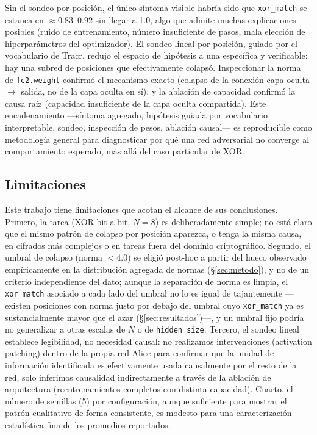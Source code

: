 \documentclass[manuscript,screen]{acmart}
\begin{document}
Sin el sondeo por posición, el único síntoma visible habría sido que \texttt{xor\_match} se
estanca en $\approx 0.83$--$0.92$ sin llegar a 1.0, algo que admite muchas explicaciones
posibles (ruido de entrenamiento, número insuficiente de pasos, mala elección de
hiperparámetros del optimizador). El sondeo lineal por posición, guiado por el vocabulario de
Tracr, redujo el espacio de hipótesis a una específica y verificable: hay una subred de
posiciones que efectivamente colapsó. Inspeccionar la norma de \texttt{fc2.weight} confirmó el
mecanismo exacto (colapso de la conexión capa oculta $\to$ salida, no de la capa oculta en sí),
y la ablación de capacidad confirmó la causa raíz (capacidad insuficiente de la capa oculta
compartida). Este encadenamiento —síntoma agregado, hipótesis guiada por vocabulario
interpretable, sondeo, inspección de pesos, ablación causal— es reproducible como metodología
general para diagnosticar por qué una red adversarial no converge al comportamiento esperado,
más allá del caso particular de XOR.

\subsection{Limitaciones}

Este trabajo tiene limitaciones que acotan el alcance de sus conclusiones. Primero, la tarea
(XOR bit a bit, $N=8$) es deliberadamente simple; no está claro que el mismo patrón de colapso
por posición aparezca, o tenga la misma causa, en cifrados más complejos o en tareas fuera del
dominio criptográfico. Segundo, el umbral de colapso (norma $<4.0$) se eligió post-hoc a partir
del hueco observado empíricamente en la distribución agregada de normas
(\S\ref{sec:metodo}), y no de un criterio independiente del dato; aunque la separación de norma
es limpia, el \texttt{xor\_match} asociado a cada lado del umbral no lo es igual de tajantemente
—existen posiciones con norma justo por debajo del umbral cuyo \texttt{xor\_match} ya es
sustancialmente mayor que el azar (\S\ref{sec:resultados})—, y un umbral fijo podría no
generalizar a otras escalas de $N$ o de \texttt{hidden\_size}. Tercero,
el sondeo lineal establece legibilidad, no necesidad causal: no realizamos intervenciones
(activation patching) dentro de la propia red Alice para confirmar que la unidad de información
identificada es efectivamente usada causalmente por el resto de la red, solo inferimos
causalidad indirectamente a través de la ablación de arquitectura (reentrenamientos completos
con distinta capacidad). Cuarto, el número de semillas (5) por configuración, aunque suficiente
para mostrar el patrón cualitativo de forma consistente, es modesto para una caracterización
estadística fina de los promedios reportados.
\end{document}
